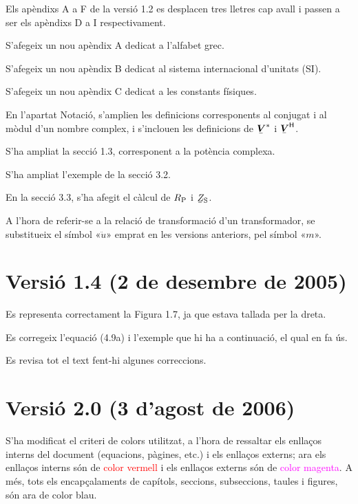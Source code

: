 Els apèndixs A a F de la versió 1.2 es desplacen tres lletres cap
avall i passen a ser els apèndixs D a I respectivament.

S'afegeix un nou apèndix A dedicat a l'alfabet grec.

S'afegeix un nou apèndix B dedicat al sistema internacional
d'unitats (SI).

S'afegeix un nou apèndix C dedicat a les constants físiques.

En l'apartat Notació, s'amplien les definicions corresponents al
conjugat i al mòdul d'un nombre complex, i s'inclouen les
definicions de $\mcmplx{V}^*$ i $\hermit{V}$.

S'ha ampliat la secció 1.3, corresponent a la
potència complexa.

 S'ha ampliat l'exemple de la secció 3.2.

En la secció 3.3, s'ha afegit el càlcul de $R_\mathrm{P}$ i
$\cmplx{Z}\ped{S}$.

 A l'hora de referir-se a la
relació de transformació d'un transformador, se substitueix el
símbol «$\ddot{u}$» emprat en les versions anteriors, pel símbol
«$m$».

\section*{Versió 1.4 (2 de desembre de 2005)}

Es representa correctament la Figura 1.7, ja que estava
tallada per la dreta.

Es corregeix l'equació (4.9a) i l'exemple que hi
ha a continuació, el qual en fa ús.

Es revisa tot el text fent-hi algunes correccions.

\section*{Versió 2.0 (3 d'agost de 2006)}

S'ha modificat el criteri de colors utilitzat, a l'hora de ressaltar
els enllaços interns del document (equacions, pàgines, etc.) i els
enllaços externs; ara els enllaços interns són de
\textcolor{red}{color vermell} i els enllaços externs són de
\textcolor{magenta}{color magenta}. A més, tots els encapçalaments
de capítols, seccions,
 subseccions, taules  i figures, són ara de
 \textcolor{NavyBlue}{color blau}.

